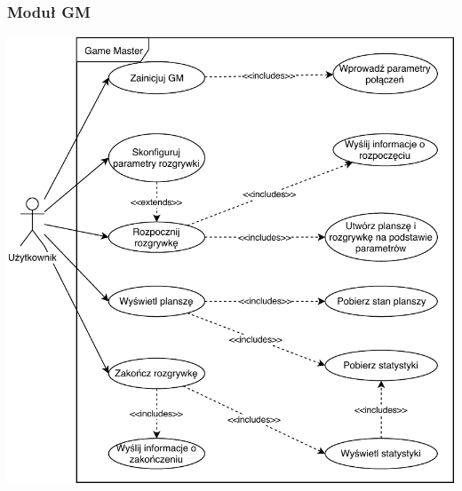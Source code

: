 \documentclass[../Dokumentacja.tex]{subfiles}
\begin{document}
\subsubsection{Moduł GM}
\includegraphics[width=\textwidth]{resources/USER-GM.pdf}
\end{document}
